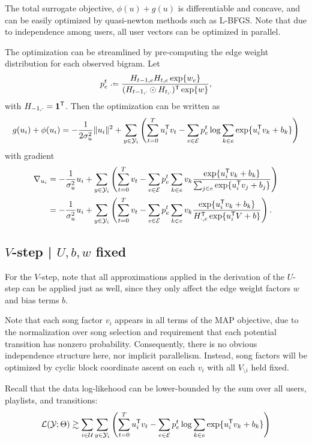 \documentclass{article}
\def\E{\ensuremath{\mathcal{E}}}
\def\U{\ensuremath{\mathcal{U}}}
\begin{document}
The total surrogate objective, $\phi(u) + g(u)$ is differentiable and concave, and can be easily optimized by quasi-newton methods such as L-BFGS.
Note that due to independence among users, all user vectors can be optimized in parallel.

The optimization can be streamlined by pre-computing the edge weight distribution for each observed bigram.  Let 
\[
p_e^t \defeq \frac{H_{t-1,e}H_{t,e} \exp\{w_e\}}{(H_{t-1,\cdot}\odot H_{t,\cdot})\trans \exp\{w\}},
\]
with $H_{-1,\cdot} = \mathbf{1}^\mathsf{T}$.  Then the optimization can be written as 
\[
g(u_i) + \phi(u_i) = -\frac{1}{2\sigma_u^2} \|u_i\|^2 + \sum_{y \in \Y_i} \left(\sum_{t=0}^T u_i\trans v_t - \sum_{e \in \E} p_e^t \log \sum_{k\in e} \exp\{u_i\trans v_k + b_k\} \right)
\]
with gradient
\begin{align}
\nabla_{u_i} &= -\frac{1}{\sigma_u^2} u_i + \sum_{y \in \Y_i} \left(\sum_{t=0}^T v_t - \sum_{e \in \E} p_e^t \sum_{k\in e} v_k \frac{\exp\{u_i\trans v_k + b_k\}}{\sum_{j \in e}
\exp\{u_i \trans v_j + b_j\}} \right)\notag\\
&= -\frac{1}{\sigma_u^2} u_i + \sum_{y \in \Y_i} \left(\sum_{t=0}^T v_t - \sum_{e \in \E} p_e^t \sum_{k\in e} v_k \frac{\exp\{u_i\trans v_k + b_k\}}{H_{\cdot,e}\trans \exp\{u_i \trans
V + b\}} \right).\label{eq:ustep:gradient}
\end{align}

\subsection{$V$-step | $U, b, w$ fixed}
For the $V$-step, note that all approximations applied in the derivation of the $U$-step can be applied just as well, since they only affect the edge weight factors $w$ and bias terms
$b$.

Note that each song factor $v_i$ appears in all terms of the MAP objective, due to the normalization over song selection and requirement that each potential transition has nonzero 
probability.  Consequently, there is no obvious independence structure here, nor implicit parallelism.  
Instead, song factors will be optimized by cyclic block coordinate ascent on each $v_i$ with all $V_{\setminus i}$ held fixed.

Recall that the data log-likehood can be lower-bounded by the sum over all users, playlists, and transitions:
\[
\Ell(\Y; \Theta) \gtrsim \sum_{i \in \U} \sum_{y \in \Y_i} \left(\sum_{t=0}^T u_i\trans v_t - \sum_{e \in \E} p_e^t \log \sum_{k\in e} \exp\{u_i\trans v_k + b_k\} \right)
\]
\end{document}
